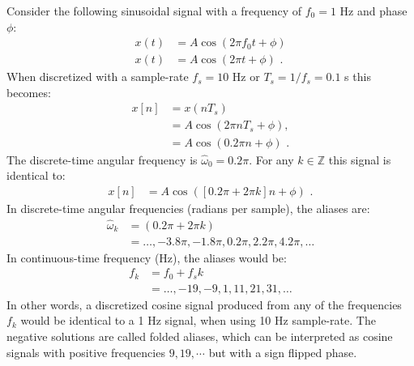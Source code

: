 Consider the following sinusoidal signal with a frequency of $f_0 =1$ Hz and phase $\phi$:
\begin{align}
x(t)&=A\cos(2\pi f_0 t + \phi)\\
x(t)&=A\cos(2\pi t + \phi)\,\,.
\end{align}
When discretized with a sample-rate $f_s=10$ Hz or $T_s=1/f_s = 0.1$ s this
becomes:
\begin{align}
x[n]&=x(nT_s)\\
    &=A\cos(2\pi n T_s + \phi),\\
    &=A\cos(0.2\pi n + \phi)\,\,.
\end{align}
The discrete-time angular frequency is $\hat{\omega}_0 = 0.2\pi$. For any $k\in\mathbb{Z}$ this signal is identical to:
\begin{align}
x[n] &=A\cos([0.2\pi + 2\pi k] n + \phi)\,\,.
\end{align}
In discrete-time angular frequencies (radians per sample), the aliases are:
\begin{align}
  \hat{\omega}_k  &= (0.2\pi+2\pi k)\\
  &=\ldots,-3.8\pi,-1.8\pi,0.2\pi,2.2\pi,4.2\pi,\ldots
\end{align}
In continuous-time frequency (Hz), the aliases would be:
\begin{align}
f_k &=f_0 + f_s k\\
&=\ldots,-19,-9,1,11,21,31,\ldots
\end{align}
In other words, a discretized cosine signal produced from any of the frequencies $f_k$ would be identical to a 1 Hz signal, when using 10 Hz sample-rate. The negative solutions are called folded aliases, which can be interpreted as cosine signals with positive frequencies $9,19,\cdots$ but with a sign flipped phase.

